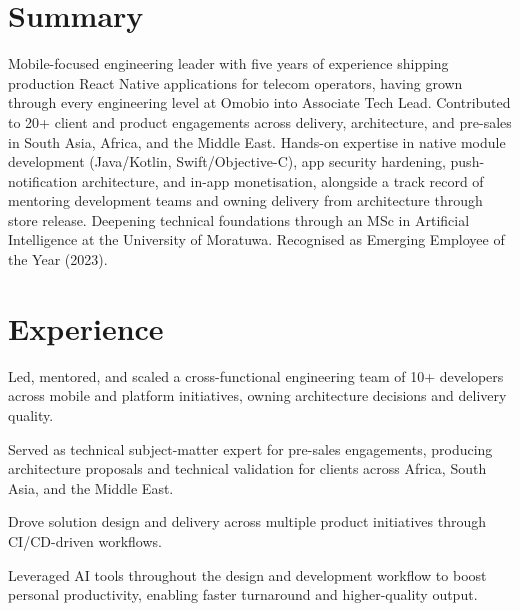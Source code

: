 \documentclass[10.5pt]{article}
\begin{document}

\section*{Summary}
Mobile-focused engineering leader with five years of experience shipping production React Native applications for telecom operators, having grown through every engineering level at Omobio into Associate Tech Lead. Contributed to 20+ client and product engagements across delivery, architecture, and pre-sales in South Asia, Africa, and the Middle East. Hands-on expertise in native module development (Java/Kotlin, Swift/Objective-C), app security hardening, push-notification architecture, and in-app monetisation, alongside a track record of mentoring development teams and owning delivery from architecture through store release. Deepening technical foundations through an MSc in Artificial Intelligence at the University of Moratuwa. Recognised as Emerging Employee of the Year (2023).

\section*{Experience}

\begin{cvitems}
  \item Led, mentored, and scaled a cross-functional engineering team of 10+ developers across mobile and platform initiatives, owning architecture decisions and delivery quality.
  \item Served as technical subject-matter expert for pre-sales engagements, producing architecture proposals and technical validation for clients across Africa, South Asia, and the Middle East.
  \item Drove solution design and delivery across multiple product initiatives through CI/CD-driven workflows.
  \item Leveraged AI tools throughout the design and development workflow to boost personal productivity, enabling faster turnaround and higher-quality output.
\end{cvitems}
\end{document}
